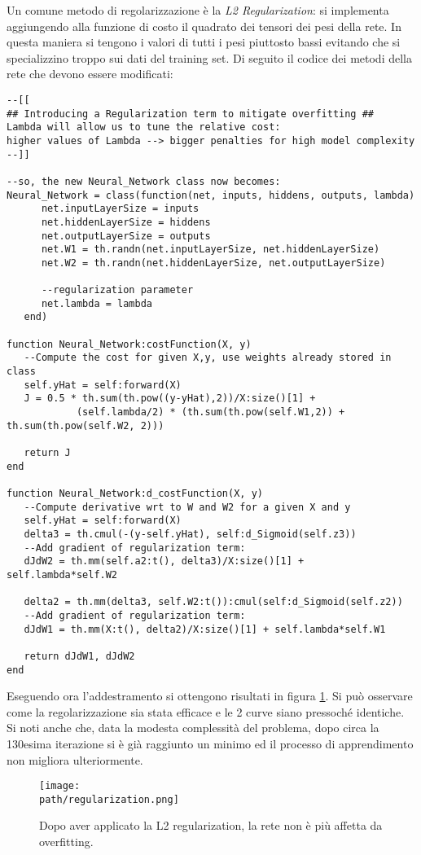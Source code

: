 Un comune metodo di regolarizzazione è la \emph{L2 Regularization}: si implementa aggiungendo alla funzione di costo il quadrato dei tensori dei pesi della rete. In questa maniera si tengono i valori di tutti i pesi piuttosto bassi evitando che si specializzino troppo sui dati del training set. Di seguito il codice dei metodi della rete che devono essere modificati:  
\begin{lstlisting}[language={[5.2]Lua}]
--[[
## Introducing a Regularization term to mitigate overfitting ## 
Lambda will allow us to tune the relative cost: 
higher values of Lambda --> bigger penalties for high model complexity 
--]]

--so, the new Neural_Network class now becomes:
Neural_Network = class(function(net, inputs, hiddens, outputs, lambda)
      net.inputLayerSize = inputs
      net.hiddenLayerSize = hiddens
      net.outputLayerSize = outputs
      net.W1 = th.randn(net.inputLayerSize, net.hiddenLayerSize)
      net.W2 = th.randn(net.hiddenLayerSize, net.outputLayerSize)

      --regularization parameter
      net.lambda = lambda
   end)

function Neural_Network:costFunction(X, y)
   --Compute the cost for given X,y, use weights already stored in class
   self.yHat = self:forward(X)
   J = 0.5 * th.sum(th.pow((y-yHat),2))/X:size()[1] + 
            (self.lambda/2) * (th.sum(th.pow(self.W1,2)) + th.sum(th.pow(self.W2, 2)))

   return J
end

function Neural_Network:d_costFunction(X, y)
   --Compute derivative wrt to W and W2 for a given X and y
   self.yHat = self:forward(X)
   delta3 = th.cmul(-(y-self.yHat), self:d_Sigmoid(self.z3))
   --Add gradient of regularization term:
   dJdW2 = th.mm(self.a2:t(), delta3)/X:size()[1] + self.lambda*self.W2

   delta2 = th.mm(delta3, self.W2:t()):cmul(self:d_Sigmoid(self.z2))
   --Add gradient of regularization term:
   dJdW1 = th.mm(X:t(), delta2)/X:size()[1] + self.lambda*self.W1

   return dJdW1, dJdW2
end
\end{lstlisting}
\linebreak
Eseguendo ora l'addestramento si ottengono risultati in figura \ref{fig:reg-plot}. Si può osservare come la regolarizzazione sia stata efficace e le 2 curve siano pressoché identiche. Si noti anche che, data la modesta complessità del problema, dopo circa la 130esima iterazione si è già raggiunto un minimo ed il processo di apprendimento non migliora ulteriormente. 
\begin{figure}[h!]
 \centering
 \texttt{[image: \\path/regularization.png]}
 \caption{Dopo aver applicato la L2 regularization, la rete non è più affetta da overfitting.}
 \label{fig:reg-plot}
\end{figure}

